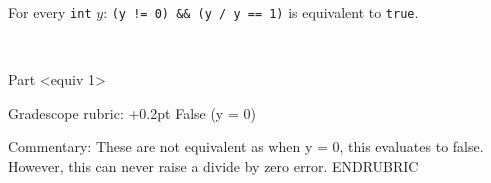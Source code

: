 \subpart
For every \lstinline'int' $y$:
\lstinline|(y != 0) && (y / y == 1)| is equivalent to \lstinline'true'.
\begin{framed}
\else~\vspace{0.9in}\fi
\end{framed}

\RUBRIC
Part <equiv 1>

Gradescope rubric:
+0.2pt False (y = 0)

Commentary:
  These are not equivalent as when y = 0, this evaluates to
  false. However, this can never raise a divide by zero error.
ENDRUBRIC

\smallskip